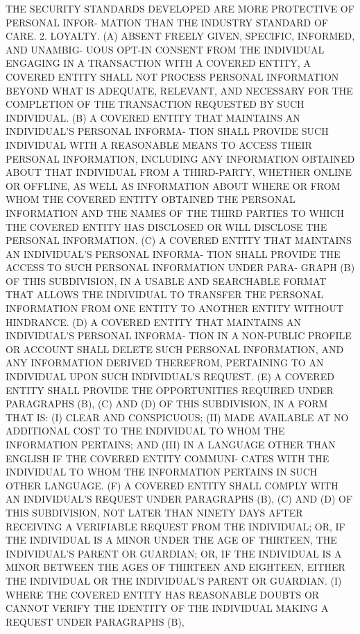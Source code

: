  THE  SECURITY STANDARDS DEVELOPED ARE MORE PROTECTIVE OF PERSONAL INFOR-
 MATION THAN THE INDUSTRY STANDARD OF CARE.
   2.  LOYALTY. (A) ABSENT FREELY GIVEN, SPECIFIC, INFORMED, AND UNAMBIG-
 UOUS OPT-IN CONSENT FROM THE INDIVIDUAL ENGAGING IN A TRANSACTION WITH A
 COVERED ENTITY, A COVERED ENTITY SHALL NOT PROCESS PERSONAL  INFORMATION
 BEYOND  WHAT  IS ADEQUATE, RELEVANT, AND NECESSARY FOR THE COMPLETION OF
 THE TRANSACTION REQUESTED BY SUCH INDIVIDUAL.
   (B) A COVERED ENTITY THAT MAINTAINS AN INDIVIDUAL'S PERSONAL  INFORMA-
 TION  SHALL  PROVIDE  SUCH  INDIVIDUAL WITH A REASONABLE MEANS TO ACCESS
 THEIR PERSONAL INFORMATION, INCLUDING  ANY  INFORMATION  OBTAINED  ABOUT
 THAT  INDIVIDUAL  FROM A THIRD-PARTY, WHETHER ONLINE OR OFFLINE, AS WELL
 AS INFORMATION ABOUT WHERE OR FROM WHOM THE COVERED ENTITY OBTAINED  THE
 PERSONAL  INFORMATION  AND  THE  NAMES OF THE THIRD PARTIES TO WHICH THE
 COVERED ENTITY HAS DISCLOSED OR WILL DISCLOSE THE PERSONAL INFORMATION.
   (C) A COVERED ENTITY THAT MAINTAINS AN INDIVIDUAL'S PERSONAL  INFORMA-
 TION  SHALL  PROVIDE THE ACCESS TO SUCH PERSONAL INFORMATION UNDER PARA-
 GRAPH (B) OF THIS SUBDIVISION, IN A USABLE AND  SEARCHABLE  FORMAT  THAT
 ALLOWS  THE  INDIVIDUAL  TO  TRANSFER  THE PERSONAL INFORMATION FROM ONE
 ENTITY TO ANOTHER ENTITY WITHOUT HINDRANCE.
   (D) A COVERED ENTITY THAT MAINTAINS AN INDIVIDUAL'S PERSONAL  INFORMA-
 TION  IN  A  NON-PUBLIC  PROFILE  OR  ACCOUNT SHALL DELETE SUCH PERSONAL
 INFORMATION, AND ANY INFORMATION DERIVED  THEREFROM,  PERTAINING  TO  AN
 INDIVIDUAL UPON SUCH INDIVIDUAL'S REQUEST.
   (E)  A  COVERED  ENTITY SHALL PROVIDE THE OPPORTUNITIES REQUIRED UNDER
 PARAGRAPHS (B), (C) AND (D) OF THIS SUBDIVISION, IN A FORM THAT IS:
   (I) CLEAR AND CONSPICUOUS;
   (II) MADE AVAILABLE AT NO ADDITIONAL COST TO THE  INDIVIDUAL  TO  WHOM
 THE INFORMATION PERTAINS; AND
   (III)  IN A LANGUAGE OTHER THAN ENGLISH IF THE COVERED ENTITY COMMUNI-
 CATES WITH THE INDIVIDUAL TO WHOM THE INFORMATION PERTAINS IN SUCH OTHER
 LANGUAGE.
   (F) A COVERED ENTITY SHALL COMPLY WITH AN INDIVIDUAL'S  REQUEST  UNDER
 PARAGRAPHS  (B),  (C) AND (D) OF THIS SUBDIVISION, NOT LATER THAN NINETY
 DAYS AFTER RECEIVING A VERIFIABLE REQUEST FROM THE  INDIVIDUAL;  OR,  IF
 THE  INDIVIDUAL  IS  A MINOR UNDER THE AGE OF THIRTEEN, THE INDIVIDUAL'S
 PARENT OR GUARDIAN; OR, IF THE INDIVIDUAL IS A MINOR BETWEEN THE AGES OF
 THIRTEEN AND EIGHTEEN, EITHER THE INDIVIDUAL OR THE INDIVIDUAL'S  PARENT
 OR GUARDIAN.
   (I)  WHERE  THE  COVERED ENTITY HAS REASONABLE DOUBTS OR CANNOT VERIFY
 THE IDENTITY OF THE INDIVIDUAL MAKING A REQUEST  UNDER  PARAGRAPHS  (B),
